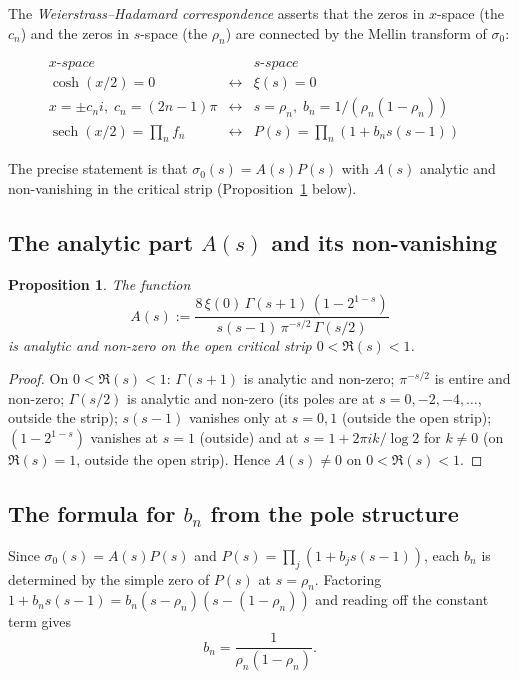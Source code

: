 \documentclass[12pt]{article}
\theoremstyle{plain}
\newtheorem{proposition}[theorem]{Proposition}
\theoremstyle{definition}
\DeclareMathOperator{\sech}{sech}
\begin{document}
The \emph{Weierstrass--Hadamard correspondence} asserts that the zeros in
$x$-space (the $c_n$) and the zeros in $s$-space (the $\rho_n$) are
connected by the Mellin transform of $\sigma_0$:

\begin{equation}\label{eq:wh_table}
  \begin{array}{cccl}
  \textit{x-space} && \textit{s-space} & \\[2pt]
  \cosh(x/2) = 0 & \longleftrightarrow & \xi(s)=0 & \\
  x=\pm c_n i,\;c_n=(2n-1)\pi & \longleftrightarrow & s=\rho_n,\;b_n=1/(\rho_n(1-\rho_n)) & \\
  \sech(x/2)=\prod_n f_n & \longleftrightarrow & P(s)=\prod_n(1+b_n s(s-1)) &
  \end{array}
\end{equation}

The precise statement is that $\sigma_0(s)=A(s)P(s)$ with $A(s)$ analytic and
non-vanishing in the critical strip (Proposition~\ref{prop:A_nonvanishing} below).

\subsection{The analytic part $A(s)$ and its non-vanishing}

\begin{proposition}\label{prop:A_nonvanishing}
The function
\[
  A(s) := \frac{8\,\xi(0)\,\Gamma(s+1)\,(1-2^{1-s})}{s(s-1)\,\pi^{-s/2}\,\Gamma(s/2)}
\]
is analytic and non-zero on the open critical strip $0<\Re(s)<1$.
\end{proposition}

\begin{proof}
On $0<\Re(s)<1$: $\Gamma(s+1)$ is analytic and non-zero; $\pi^{-s/2}$ is entire
and non-zero; $\Gamma(s/2)$ is analytic and non-zero (its poles are at
$s=0,-2,-4,\ldots$, outside the strip); $s(s-1)$ vanishes only at $s=0,1$
(outside the open strip); $(1-2^{1-s})$ vanishes at $s=1$ (outside) and at
$s=1+2\pi ik/\log 2$ for $k\ne0$ (on $\Re(s)=1$, outside the open strip).
Hence $A(s)\ne0$ on $0<\Re(s)<1$.
\end{proof}

\subsection{The formula for $b_n$ from the pole structure}

Since $\sigma_0(s)=A(s)P(s)$ and $P(s)=\prod_j(1+b_j s(s-1))$, each $b_n$ is
determined by the simple zero of $P(s)$ at $s=\rho_n$.  Factoring
$1+b_n s(s-1)=b_n(s-\rho_n)(s-(1-\rho_n))$ and reading off the constant term gives
\begin{equation}\label{eq:bn_formula_residue}
  b_n = \frac{1}{\rho_n(1-\rho_n)}.
\end{equation}
\end{document}
